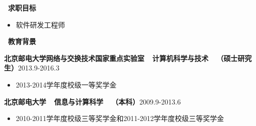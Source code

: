 \documentclass[UTF8, winfonts]{ctexart}
\begin{document}
\noindent \textbf{ \heiti \faSearch\ 求职目标}
\begin{itemize}
  \item {}软件研发工程师
\end{itemize}
\noindent \textbf{ \heiti \faGraduationCap\ 教育背景}\par
\indent \textbf{北京邮电大学网络与交换技术国家重点实验室~~计算机科学与技术~~（硕士研究生）}\hfill {}2013.9-2016.3
\begin{itemize}
  \item {}2013-2014学年度校级一等奖学金
\end{itemize}\par
\indent \textbf{北京邮电大学~~信息与计算科学~~（本科）}\hfill {}2009.9-2013.6
\begin{itemize}
  \item {}2010-2011学年度校级三等奖学金和2011-2012学年度校级三等奖学金
\end{itemize}
\end{document}
